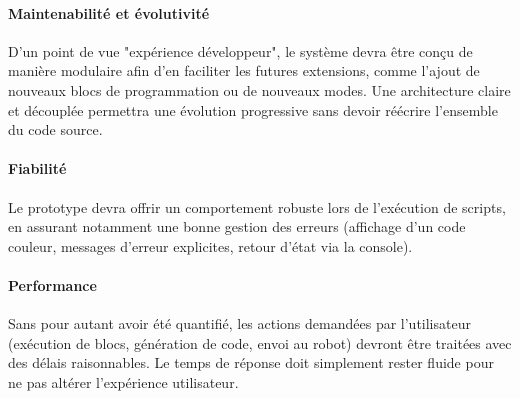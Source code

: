 \paragraph{Maintenabilité et évolutivité}
D'un point de vue "expérience développeur", le système devra être conçu de manière modulaire afin d'en faciliter les futures extensions, comme l’ajout de nouveaux blocs de programmation ou de nouveaux modes.
Une architecture claire et découplée permettra une évolution progressive sans devoir réécrire l’ensemble du code source.

\paragraph{Fiabilité}
Le prototype devra offrir un comportement robuste lors de l’exécution de scripts, en assurant notamment une bonne gestion des erreurs (affichage d’un code couleur, messages d’erreur explicites, retour d’état via la console).

\paragraph{Performance}
Sans pour autant avoir été quantifié, les actions demandées par l’utilisateur (exécution de blocs, génération de code, envoi au robot) devront être traitées avec des délais raisonnables. 
Le temps de réponse doit simplement rester fluide pour ne pas altérer l’expérience utilisateur.

